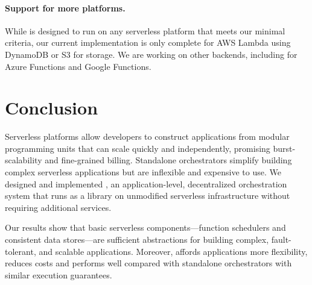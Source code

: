 \paragraph{Support for more platforms.} While \name{} is designed to run on
any serverless platform that meets our minimal criteria, our current
implementation is only complete for AWS Lambda using DynamoDB or S3 for
storage. We are working on other backends, including for Azure Functions and
Google Functions.

\section{Conclusion}\label{sec:conclusion}

Serverless platforms allow developers to construct applications from modular
programming units that can scale quickly and independently, promising
burst-scalability and fine-grained billing. Standalone orchestrators simplify
building complex serverless applications but are inflexible and expensive to
use. We designed and implemented \name {}, an application-level, decentralized
orchestration system that runs as a library on unmodified serverless
infrastructure without requiring additional services.

Our results show that basic serverless components---function schedulers and
consistent data stores---are sufficient abstractions for building complex,
fault-tolerant, and scalable applications. Moreover, \name{} affords
applications more flexibility, reduces costs and performs well compared with
standalone orchestrators with similar execution guarantees.
